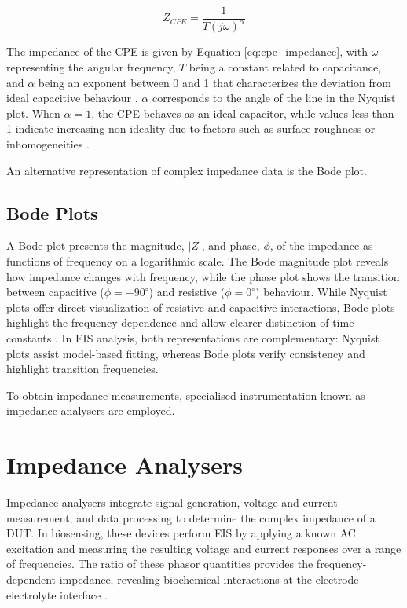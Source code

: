 \begin{equation}
    Z_{CPE} = \frac{1}{T(j\omega)^{\alpha}}
    \label{eq:cpe_impedance}
\end{equation}

The impedance of the \ac{CPE} is given by Equation \ref{eq:cpe_impedance}, with $\omega$ representing the angular frequency, $T$ being a constant related to capacitance, and $\alpha$ being an exponent between 0 and 1 that characterizes the deviation from ideal capacitive behaviour \cite{xieReviewAdvancementsNanoscale2020a}. $\alpha$ corresponds to the angle of the line in the Nyquist plot. When $\alpha = 1$, the \ac{CPE} behaves as an ideal capacitor, while values less than 1 indicate increasing non-ideality due to factors such as surface roughness or inhomogeneities \cite{xieReviewAdvancementsNanoscale2020a}.

An alternative representation of complex impedance data is the Bode plot.

\subsection{Bode Plots}

A Bode plot presents the magnitude, $|Z|$, and phase, $\phi$, of the impedance as functions of frequency on a logarithmic scale. The Bode magnitude plot reveals how impedance changes with frequency, while the phase plot shows the transition between capacitive ($\phi = -90^\circ$)  and resistive ($\phi = 0^\circ$) behaviour. While Nyquist plots offer direct visualization of resistive and capacitive interactions, Bode plots highlight the frequency dependence and allow clearer distinction of time constants \cite{BodeNyquistPlot}. In EIS analysis, both representations are complementary: Nyquist plots assist model-based fitting, whereas Bode plots verify consistency and highlight transition frequencies.

To obtain impedance measurements, specialised instrumentation known as impedance analysers are employed.

\section{Impedance Analysers}
Impedance analysers integrate signal generation, voltage and current measurement, and data processing to determine the complex impedance of a \ac{DUT}. In biosensing, these devices perform \ac{EIS} by applying a known AC excitation and measuring the resulting voltage and current responses over a range of frequencies. The ratio of these phasor quantities provides the frequency-dependent impedance, revealing biochemical interactions at the electrode–electrolyte interface \cite{lazanasErratumElectrochemicalImpedance2025}.

